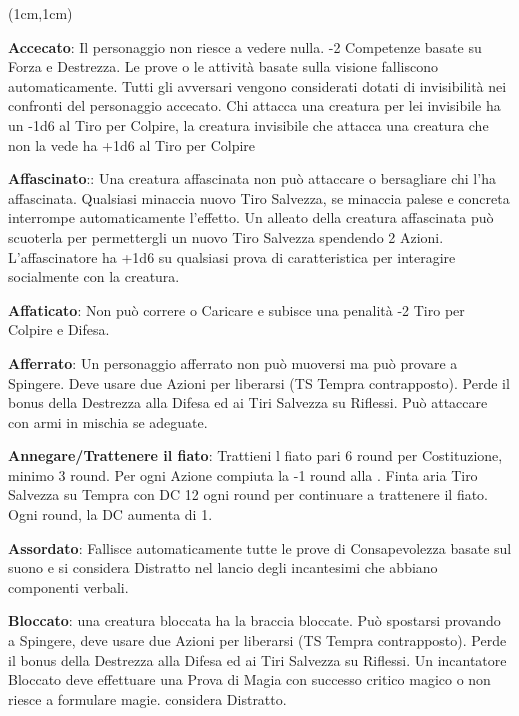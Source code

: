 \documentclass[a4paper,12 pt,openany]{book}
\begin{document}
\center

\footnotesize

\begin{textblock*}{19 cm}(1cm,1cm) %
\flushleft

\begin{multicols}{2}

\textbf{Accecato}: Il personaggio non riesce a vedere nulla. -2 Competenze basate su Forza e Destrezza. Le prove o le attività basate sulla visione falliscono automaticamente. Tutti gli avversari vengono considerati dotati di invisibilità nei confronti del personaggio accecato.  Chi attacca una creatura per lei invisibile ha un -1d6 al Tiro per Colpire, la creatura invisibile che attacca una creatura che non la vede ha +1d6 al Tiro per Colpire

\textbf{Affascinato}:: Una creatura affascinata non può attaccare o bersagliare chi l’ha affascinata. Qualsiasi minaccia nuovo Tiro Salvezza, se minaccia palese e concreta interrompe automaticamente l'effetto. Un alleato della creatura affascinata può scuoterla per permettergli un nuovo Tiro Salvezza spendendo 2 Azioni. L'affascinatore ha +1d6 su qualsiasi prova di caratteristica per interagire socialmente con la creatura.

\textbf{Affaticato}: Non può correre o Caricare e subisce una penalità -2 Tiro per Colpire e Difesa.

\textbf{Afferrato}: Un personaggio afferrato non può muoversi ma può provare a Spingere. Deve usare due Azioni per liberarsi (TS Tempra contrapposto). Perde il bonus della Destrezza alla Difesa ed ai Tiri Salvezza su Riflessi. Può attaccare con armi in mischia se adeguate.

\textbf{Annegare/Trattenere il fiato}:  Trattieni l fiato pari 6 round per Costituzione, minimo 3 round. Per ogni Azione compiuta la -1 round alla  . Finta aria Tiro Salvezza su Tempra con DC 12 ogni round per continuare a trattenere il fiato. Ogni round, la DC aumenta di 1.

\textbf{Assordato}: Fallisce automaticamente tutte le prove di Consapevolezza basate sul suono e si considera Distratto nel lancio degli incantesimi che abbiano componenti verbali.

\textbf{Bloccato}: una creatura bloccata ha la braccia bloccate. Può spostarsi provando a Spingere, deve usare due Azioni per liberarsi (TS Tempra contrapposto). Perde il bonus della Destrezza alla Difesa ed ai Tiri Salvezza su Riflessi. Un incantatore Bloccato deve effettuare una Prova di Magia con successo critico magico o non riesce a formulare magie. considera Distratto.


\end{multicols}
\end{textblock*}
\end{document}
